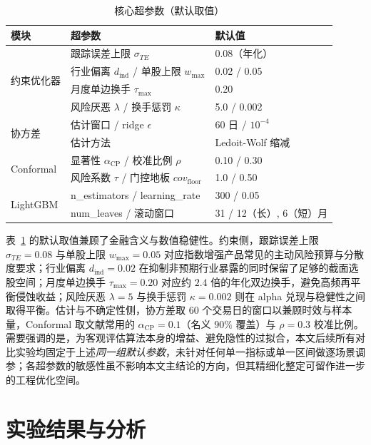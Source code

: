 \begin{table}[htbp]
\centering
\caption{核心超参数（默认取值）}
\label{tab:hparam}
\begin{tabular}{lll}
\toprule
\textbf{模块} & \textbf{超参数} & \textbf{默认值} \\
\midrule
\multirow{4}{*}{约束优化器} & 跟踪误差上限 $\sigma_{TE}$ & 0.08（年化） \\
 & 行业偏离 $d_{\text{ind}}$ / 单股上限 $w_{\max}$ & 0.02 / 0.05 \\
 & 月度单边换手 $\tau_{\max}$ & 0.20 \\
 & 风险厌恶 $\lambda$ / 换手惩罚 $\kappa$ & 5.0 / 0.002 \\
\midrule
\multirow{2}{*}{协方差} & 估计窗口 / ridge $\epsilon$ & 60 日 / $10^{-4}$ \\
 & 估计方法 & Ledoit-Wolf 缩减 \\
\midrule
\multirow{2}{*}{Conformal} & 显著性 $\alpha_{\text{CP}}$ / 校准比例 $\rho$ & 0.10 / 0.30 \\
 & 风险系数 $\tau$ / 门控地板 $cov_{\text{floor}}$ & 1.0 / 0.50 \\
\midrule
\multirow{2}{*}{LightGBM} & n\_estimators / learning\_rate & 300 / 0.05 \\
 & num\_leaves / 滚动窗口 & 31 / 12（长）, 6（短）月 \\
\bottomrule
\end{tabular}
\end{table}

表~\ref{tab:hparam} 的默认取值兼顾了金融含义与数值稳健性。约束侧，跟踪误差上限 $\sigma_{TE}=0.08$ 与单股上限 $w_{\max}=0.05$ 对应指数增强产品常见的主动风险预算与分散度要求；行业偏离 $d_{\text{ind}}=0.02$ 在抑制非预期行业暴露的同时保留了足够的截面选股空间；月度单边换手 $\tau_{\max}=0.20$ 对应约 $2.4$ 倍的年化双边换手，避免高频再平衡侵蚀收益；风险厌恶 $\lambda=5$ 与换手惩罚 $\kappa=0.002$ 则在 alpha 兑现与稳健性之间取得平衡。估计与不确定性侧，协方差取 $60$ 个交易日的窗口以兼顾时效与样本量，Conformal 取文献常用的 $\alpha_{\text{CP}}=0.1$（名义 $90\%$ 覆盖）与 $\rho=0.3$ 校准比例。需要强调的是，为客观评估算法本身的增益、避免隐性的过拟合，本文后续所有对比实验均固定于上述\emph{同一组默认参数}，未针对任何单一指标或单一区间做逐场景调参；各超参数的敏感性虽不影响本文主结论的方向，但其精细化整定可留作进一步的工程优化空间。

\section{实验结果与分析}
\label{sec:exp_results}

